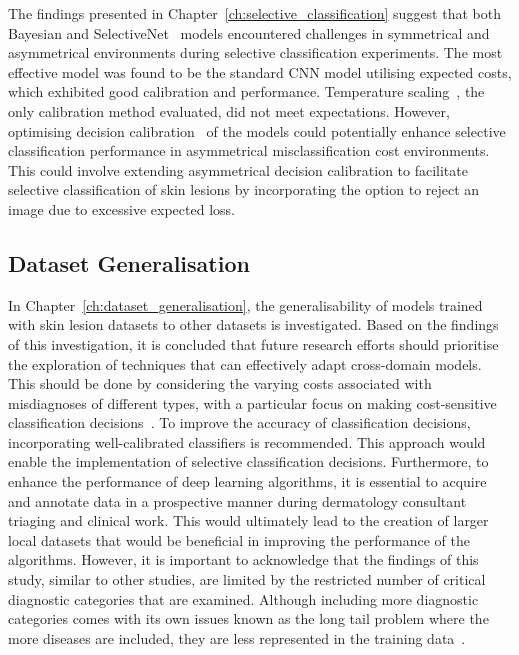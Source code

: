 The findings presented in Chapter~\ref{ch:selective_classification} suggest that both Bayesian and SelectiveNet~\citep{geifman2019selectivenet} models encountered challenges in symmetrical and asymmetrical environments during selective classification experiments. The most effective model was found to be the standard CNN model utilising expected costs, which exhibited good calibration and performance. Temperature scaling~\citep{guo2017calibration}, the only calibration method evaluated, did not meet expectations. However, optimising decision calibration~\citep{zhao2021calibrating} of the models could potentially enhance selective classification performance in asymmetrical misclassification cost environments. This could involve extending asymmetrical decision calibration to facilitate selective classification of skin lesions by incorporating the option to reject an image due to excessive expected loss.

\subsection{Dataset Generalisation}
In Chapter~\ref{ch:dataset_generalisation}, the generalisability of models trained with skin lesion datasets to other datasets is investigated. Based on the findings of this investigation, it is concluded that future research efforts should prioritise the exploration of techniques that can effectively adapt cross-domain models. This should be done by considering the varying costs associated with misdiagnoses of different types, with a particular focus on making cost-sensitive classification decisions~\citep{guan2021domain,carse2021robust}. To improve the accuracy of classification decisions, incorporating well-calibrated classifiers is recommended. This approach would enable the implementation of selective classification decisions. Furthermore, to enhance the performance of deep learning algorithms, it is essential to acquire and annotate data in a prospective manner during dermatology consultant triaging and clinical work. This would ultimately lead to the creation of larger local datasets that would be beneficial in improving the performance of the algorithms. However, it is important to acknowledge that the findings of this study, similar to other studies, are limited by the restricted number of critical diagnostic categories that are examined. Although including more diagnostic categories comes with its own issues known as the long tail problem where the more diseases are included, they are less represented in the training data~\citep{roy2022does}.